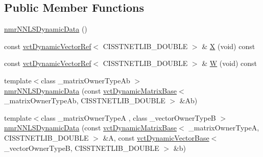 \subsection*{Public Member Functions}
\begin{DoxyCompactItemize}
\item 
\hyperlink{classnmr_n_n_l_s_dynamic_data_af5be3bf2d38fe8b32fa7a477e6cd3bff}{nmr\+N\+N\+L\+S\+Dynamic\+Data} ()
\item 
const \hyperlink{classvct_dynamic_vector_ref}{vct\+Dynamic\+Vector\+Ref}$<$ C\+I\+S\+S\+T\+N\+E\+T\+L\+I\+B\+\_\+\+D\+O\+U\+B\+L\+E $>$ \& \hyperlink{classnmr_n_n_l_s_dynamic_data_a2c67d4c5f9eff20ae015e60f85718f02}{X} (void) const 
\item 
const \hyperlink{classvct_dynamic_vector_ref}{vct\+Dynamic\+Vector\+Ref}$<$ C\+I\+S\+S\+T\+N\+E\+T\+L\+I\+B\+\_\+\+D\+O\+U\+B\+L\+E $>$ \& \hyperlink{classnmr_n_n_l_s_dynamic_data_ae3204dc027313115b092088253dc4bb0}{W} (void) const 
\end{DoxyCompactItemize}
{\bf }\par
\begin{DoxyCompactItemize}
\item 
{\footnotesize template$<$class \+\_\+matrix\+Owner\+Type\+Ab $>$ }\\\hyperlink{classnmr_n_n_l_s_dynamic_data_ab5e89d385747b087c4861b927bf5bd43}{nmr\+N\+N\+L\+S\+Dynamic\+Data} (const \hyperlink{classvct_dynamic_matrix_base}{vct\+Dynamic\+Matrix\+Base}$<$ \+\_\+matrix\+Owner\+Type\+Ab, C\+I\+S\+S\+T\+N\+E\+T\+L\+I\+B\+\_\+\+D\+O\+U\+B\+L\+E $>$ \&Ab)
\item 
{\footnotesize template$<$class \+\_\+matrix\+Owner\+Type\+A , class \+\_\+vector\+Owner\+Type\+B $>$ }\\\hyperlink{classnmr_n_n_l_s_dynamic_data_a7232702cec6f3a6a49061a14ceac7554}{nmr\+N\+N\+L\+S\+Dynamic\+Data} (const \hyperlink{classvct_dynamic_matrix_base}{vct\+Dynamic\+Matrix\+Base}$<$ \+\_\+matrix\+Owner\+Type\+A, C\+I\+S\+S\+T\+N\+E\+T\+L\+I\+B\+\_\+\+D\+O\+U\+B\+L\+E $>$ \&A, const \hyperlink{classvct_dynamic_vector_base}{vct\+Dynamic\+Vector\+Base}$<$ \+\_\+vector\+Owner\+Type\+B, C\+I\+S\+S\+T\+N\+E\+T\+L\+I\+B\+\_\+\+D\+O\+U\+B\+L\+E $>$ \&b)
\end{DoxyCompactItemize}

